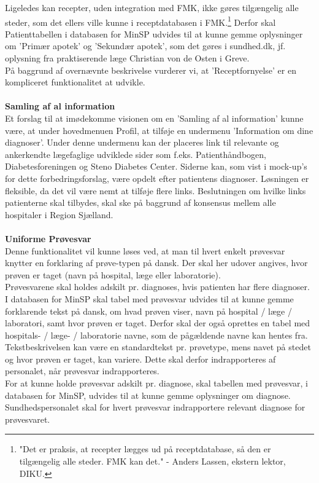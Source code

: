 Ligeledes kan recepter, uden integration med FMK, ikke gøres tilgængelig alle steder, som det ellers ville kunne i receptdatabasen i FMK.\footnote{"Det er praksis, at recepter lægges ud på receptdatabase, så den er tilgængelig alle steder. FMK kan det." - Anders Lassen, ekstern lektor, DIKU.} Derfor skal Patienttabellen i databasen for MinSP  udvides til at kunne gemme oplysninger om 'Primær apotek' og 'Sekundær apotek', som det gøres i sundhed.dk, jf. oplysning fra praktiserende læge Christian von de Osten i Greve.\\ 
På baggrund af overnævnte beskrivelse vurderer vi, at 'Receptfornyelse' er en kompliceret funktionalitet at udvikle.
\\\\
\textbf{Samling af al information} \\
Et forslag til at imødekomme visionen om en 'Samling af al information' kunne være, at under hovedmenuen Profil, at tilføje en undermenu 'Information om dine diagnoser'. Under denne undermenu kan der placeres link til relevante og ankerkendte lægefaglige udviklede sider som f.eks. Patienthåndbogen, Diabetesforeningen og Steno Diabetes Center. Siderne kan, som vist i mock-up's for dette forbedringsforslag, være opdelt efter patientens diagnoser. Løsningen er fleksible, da det vil være nemt at tilføje flere links. Beslutningen om hvilke links patienterne skal tilbydes, skal ske på baggrund af konsensus mellem alle hospitaler i Region Sjælland. 
\\\\ 
\textbf{Uniforme Prøvesvar} \\
Denne funktionalitet vil kunne løses ved, at man til hvert enkelt prøvesvar knytter en forklaring af prøve-typen på dansk. Der skal her udover angives, hvor prøven er taget (navn på hospital, læge eller laboratorie).\\
Prøvesvarene skal holdes adskilt pr. diagnoses, hvis patienten har flere diagnoser.\\
I databasen for MinSP skal tabel med prøvesvar udvides til at kunne gemme forklarende tekst på dansk, om hvad prøven viser, navn på hospital / læge / laboratori, samt hvor prøven er taget. Derfor skal der også oprettes en tabel med hospitals- / læge- / laboratorie navne, som de pågældende navne kan hentes fra.\\ 
Tekstbeskrivelsen kan være en standardtekst pr. prøvetype, mens navet på stedet og hvor prøven er taget, kan variere. Dette skal derfor indrapporteres af personalet, når prøvesvar indrapporteres. \\
For at kunne holde prøvesvar adskilt pr. diagnose, skal tabellen med prøvesvar, i databasen for MinSP, udvides til at kunne gemme oplysninger om diagnose. Sundhedspersonalet skal for hvert prøvesvar indrapportere relevant diagnose for prøvesvaret. 
